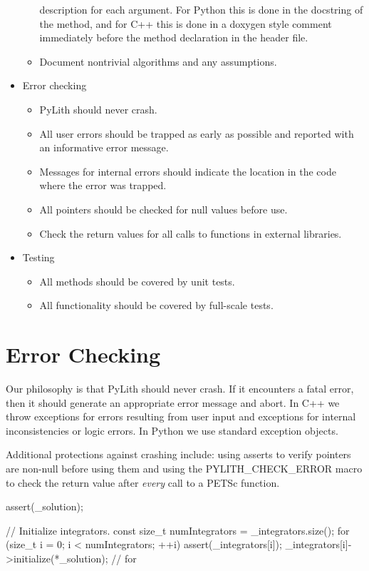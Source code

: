 \begin{itemize}
\begin{itemize}
      description for each argument. For Python this is done in the
      docstring of the method, and for C++ this is done in a doxygen
      style comment immediately before the method declaration in the
      header file.
    \item Document nontrivial algorithms and any assumptions.
    \end{itemize}
  \item Error checking
    \begin{itemize}
    \item PyLith should never crash.
    \item All user errors should be trapped as early as possible and
      reported with an informative error message.
    \item Messages for internal errors should indicate the location in
      the code where the error was trapped.
    \item All pointers should be checked for null values before use.
    \item Check the return values for all calls to functions in external
      libraries.
    \end{itemize}
  \item Testing
    \begin{itemize}
    \item All methods should be covered by unit tests.
    \item All functionality should be covered by full-scale tests.
    \end{itemize}
\end{itemize}

\section{Error Checking}

Our philosophy is that PyLith should never crash. If it encounters a
fatal error, then it should generate an appropriate error message and
abort. In C++ we throw  exceptions for
errors resulting from user input and 
exceptions for internal inconsistencies or logic errors. In Python we
use standard exception objects.

Additional protections against crashing include: using asserts to
verify pointers are non-null before using them and using the
PYLITH\_CHECK\_ERROR macro to check the return value after {\em every}
call to a PETSc function.

\begin{cplusplus}
    assert(_solution);

    // Initialize integrators.
    const size_t numIntegrators = _integrators.size();
    for (size_t i = 0; i < numIntegrators; ++i) {
        assert(_integrators[i]);
        _integrators[i]->initialize(*_solution);
    } // for  
\end{cplusplus}

